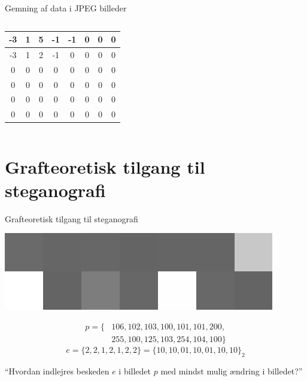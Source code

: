 \begin{frame}{Gemning af data i JPEG billeder}{}
\begin{minipage}[0.5\textheight]{\textwidth}
\begin{columns}[T]
\begin{column}{0.5\textwidth}
{\begin{table}[]
\begin{tabular}{|c|c|c|c|c|c|c|c|}
							-3  & 1  & 5  & -1 & -1 & 0  & 0 & 0 \\ \hline
							-3  & 1  & 2  & -1 & 0  & 0  & 0 & 0 \\ \hline
							0   & 0  & 0  & 0  & 0  & 0  & 0 & 0 \\ \hline
							0   & 0  & 0  & 0  & 0  & 0  & 0 & 0 \\ \hline
							0   & 0  & 0  & 0  & 0  & 0  & 0 & 0 \\ \hline
							0   & 0  & 0  & 0  & 0  & 0  & 0 & 0 \\ \hline
						\end{tabular}
					\end{table}
				}
			\end{column}
		\end{columns}
	\end{minipage}
	
\end{frame}

\section{Grafteoretisk tilgang til steganografi}
\begin{frame}{Grafteoretisk tilgang til steganografi}{}
	\begin{center}
		\includegraphics[width=.4\textwidth, frame]{figures/pixelgrid.png}
	\end{center}
	\begin{align*}
		p = \{&106,102,103,100,101,101,200,\\&255,100,125,103,254,104,100\}
	\end{align*}
	$$ e = \{2,2,1,2,1,2,2\} = \{10,10,01,10,01,10,10\}_2$$
	
	``Hvordan indlejres beskeden $e$ i billedet $p$ med mindst mulig ændring i billedet?''
\end{frame}

